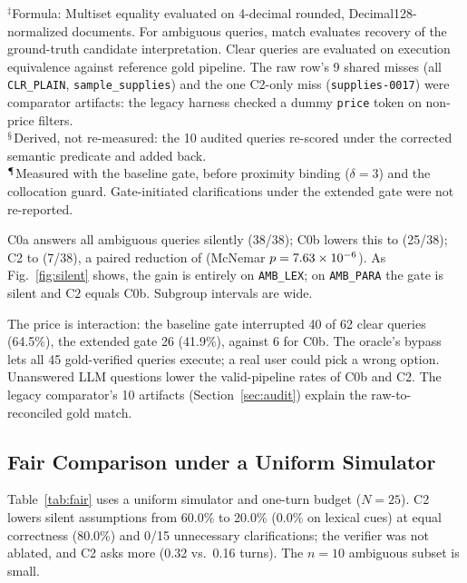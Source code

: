 \begin{table}[t]
\footnotesize{$^{\ddagger}$Formula: Multiset equality evaluated on 4-decimal rounded, Decimal128-normalized documents. For ambiguous queries, match evaluates recovery of the ground-truth candidate interpretation. Clear queries are evaluated on execution equivalence against reference gold pipeline. The raw row's 9 shared misses (all \texttt{CLR\_PLAIN}, \texttt{sample\_supplies}) and the one C2-only miss (\texttt{supplies-0017}) were comparator artifacts: the legacy harness checked a dummy \texttt{price} token on non-price filters.}\\
\footnotesize{$^{\mathsection}$Derived, not re-measured: the 10 audited queries re-scored under the corrected semantic predicate and added back.}\\
\footnotesize{$^{\mathparagraph}$Measured with the baseline gate, before proximity binding ($\delta{=}3$) and the collocation guard. Gate-initiated clarifications under the extended gate were not re-reported.}
\end{table}

C0a answers all ambiguous queries silently (38/38); C0b lowers this to \eTwoECZeroBSilentAmb{} (25/38); C2 to \eTwoECTwoSilentAmb{} (7/38), a paired reduction of \eTwoESilentAmbDelta{} (McNemar $p = 7.63\times 10^{-6}{}$). As Fig.~\ref{fig:silent} shows, the gain is entirely on \texttt{AMB\_LEX}; on \texttt{AMB\_PARA} the gate is silent and C2 equals C0b. Subgroup intervals are wide.

The price is interaction: the baseline gate interrupted 40 of 62 clear queries (64.5\%), the extended gate 26 (41.9\%), against 6 for C0b. The oracle's bypass lets all 45 gold-verified queries execute; a real user could pick a wrong option. Unanswered LLM questions lower the valid-pipeline rates of C0b and C2. The legacy comparator's 10 artifacts (Section~\ref{sec:audit}) explain the raw-to-reconciled gold match.

\subsection{Fair Comparison under a Uniform Simulator}
\label{sec:fair}
Table~\ref{tab:fair} uses a uniform simulator and one-turn budget ($N{=}25$). C2 lowers silent assumptions from 60.0\% to 20.0\% (0.0\% on lexical cues) at equal correctness (80.0\%) and 0/15 unnecessary clarifications; the verifier was not ablated, and C2 asks more (0.32 vs.\ 0.16 turns). The $n{=}10$ ambiguous subset is small.

